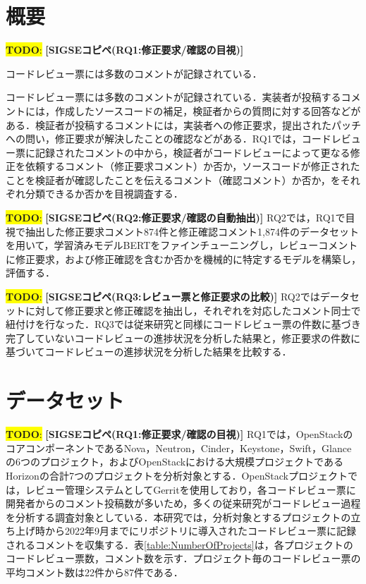 \documentclass[11pt]{jreport}
\newcommand{\todo}[1]{\colorbox{yellow}{{\bf TODO}:}{\color{red} {\textbf{[#1]}}}}
\begin{document}
\section{概要}
\todo{SIGSEコピペ(RQ1:修正要求/確認の目視)}

コードレビュー票には多数のコメントが記録されている．

コードレビュー票には多数のコメントが記録されている．実装者が投稿するコメントには，作成したソースコードの補足，検証者からの質問に対する回答などがある．検証者が投稿するコメントには，実装者への修正要求，提出されたパッチへの問い，修正要求が解決したことの確認などがある．RQ1では，コードレビュー票に記録されたコメントの中から，検証者がコードレビューによって更なる修正を依頼するコメント（修正要求コメント）か否か，ソースコードが修正されたことを検証者が確認したことを伝えるコメント（確認コメント）か否か，をそれぞれ分類できるか否かを目視調査する．

\todo{SIGSEコピペ(RQ2:修正要求/確認の自動抽出)}
RQ2では，RQ1で目視で抽出した修正要求コメント874件と修正確認コメント1,874件のデータセットを用いて，学習済みモデルBERTをファインチューニングし，レビューコメントに修正要求，および修正確認を含むか否かを機械的に特定するモデルを構築し，評価する．

\todo{SIGSEコピペ(RQ3:レビュー票と修正要求の比較)}
RQ2ではデータセットに対して修正要求と修正確認を抽出し，それぞれを対応したコメント同士で紐付けを行なった．RQ3では従来研究と同様にコードレビュー票の件数に基づき完了していないコードレビューの進捗状況を分析した結果と，修正要求の件数に基づいてコードレビューの進捗状況を分析した結果を比較する．

\section{データセット}

\todo{SIGSEコピペ(RQ1:修正要求/確認の目視)}
RQ1では，OpenStackのコアコンポーネントであるNova，Neutron，Cinder，Keystone，Swift，Glanceの6つのプロジェクト，およびOpenStackにおける大規模プロジェクトであるHorizonの合計7つのプロジェクトを分析対象とする．OpenStackプロジェクトでは，レビュー管理システムとしてGerritを使用しており，各コードレビュー票に開発者からのコメント投稿数が多いため，多くの従来研究がコードレビュー過程を分析する調査対象としている．本研究では，分析対象とするプロジェクトの立ち上げ時から2022年9月までにリポジトリに導入されたコードレビュー票に記録されるコメントを収集する．表\ref{table:NumberOfProjects}は，各プロジェクトのコードレビュー票数，コメント数を示す．プロジェクト毎のコードレビュー票の平均コメント数は22件から87件である．
\end{document}
